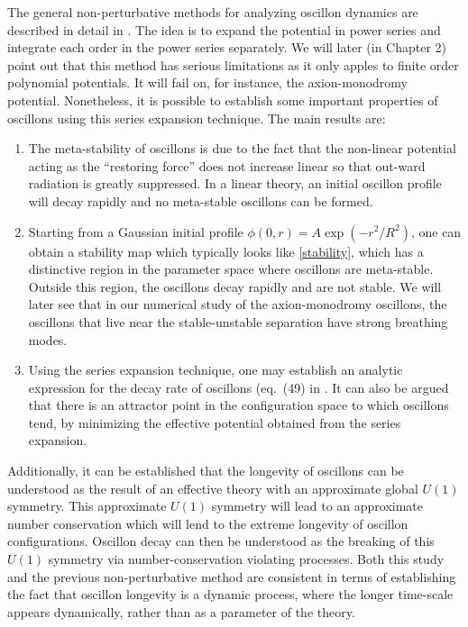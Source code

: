 \documentclass{report}
\begin{document}
The general non-perturbative methods for analyzing oscillon dynamics are described in detail in \cite{Copeland:1995fq, PhysRevD.80.125037, Gleiser:2008ty}. The idea is to expand the potential in power series and integrate each order in the power series separately. We will later (in Chapter 2) point out that this method has serious limitations as it only apples to finite order polynomial potentials. It will fail on, for instance, the axion-monodromy potential. Nonetheless, it is possible to establish some important properties of oscillons using this series expansion technique. The main results are:
\begin{enumerate}
\item The meta-stability of oscillons is due to the fact that the non-linear potential acting as the ``restoring force'' does not increase linear so that out-ward radiation is greatly suppressed. In a linear theory, an initial oscillon profile will decay rapidly and no meta-stable oscillons can be formed.
\item Starting from a Gaussian initial profile $\phi(0,r)=A\exp(-r^2/R^2)$, one can obtain a stability map which typically looks like \ref{stability}, which has a distinctive region in the parameter space where oscillons are meta-stable. Outside this region, the oscillons decay rapidly and are not stable. We will later see that in our numerical study of the axion-monodromy oscillons, the oscillons that live near the stable-unstable separation have strong breathing modes.
\item Using the series expansion technique, one may establish an analytic expression for the decay rate of oscillons (eq.~(49) in \cite{PhysRevD.80.125037}. It can also be argued that there is an attractor point in the configuration space to which oscillons tend, by minimizing the effective potential obtained from the series expansion.
\end{enumerate}

Additionally, it can be established \cite{Mukaida:2016hwd} that the longevity of oscillons can be understood as the result of an effective theory with an approximate global $U(1)$ symmetry. This approximate $U(1)$ symmetry will lead to an approximate number conservation which will lend to the extreme longevity of oscillon configurations. Oscillon decay can then be understood as the breaking of this $U(1)$ symmetry via number-conservation violating processes. Both this study and the previous non-perturbative method are consistent in terms of establishing the fact that oscillon longevity is a dynamic process, where the longer time-scale appears dynamically, rather than as a parameter of the theory.
\end{document}
